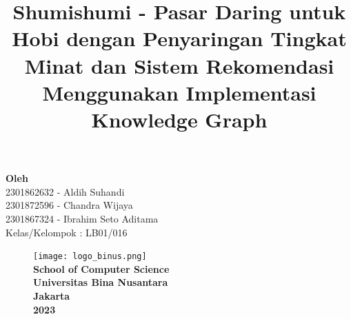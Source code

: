 \documentclass[a4paper]{article}
\begin{document}
\date{}
\title{Shumishumi - Pasar Daring untuk Hobi dengan Penyaringan Tingkat Minat dan Sistem Rekomendasi Menggunakan Implementasi Knowledge Graph}
\clearpage\maketitle
{}
\vspace{4em}%
\begin{center}
    \textbf{Oleh}\\%
    \vspace{0.10cm}%
    2301862632 - Aldih Suhandi\\%
    2301872596 - Chandra Wijaya\\%
    2301867324 - Ibrahim Seto Aditama\\%
    Kelas/Kelompok : LB01/016
\end{center}
\thispagestyle{empty}
\begin{figure}[h]
    \centering
    \texttt{[image: logo\_binus.png]}\\
    \textbf{School of Computer Science\\
    Universitas Bina Nusantara\\
    Jakarta\\
    2023}
\end{figure}

\newpage
{}


\newpage
{}


\newpage
{}


\newpage
{}


\newpage
{}
\tableofcontents

\newpage
{}
\listoftables

\newpage
{}
\listoffigures

\newpage
{}
\listofappendices
\end{document}
